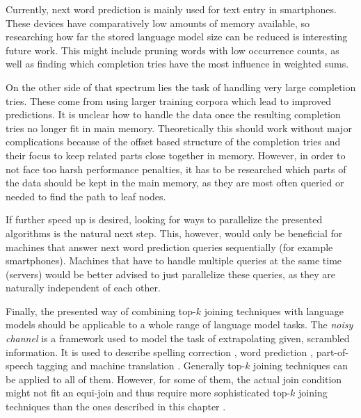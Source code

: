 Currently, next word prediction is mainly used for text entry in smartphones.
These devices have comparatively low amounts of memory available, so researching
how far the stored language model size can be reduced is interesting future
work.
This might include pruning words with low occurrence counts, as well as finding
which completion tries have the most influence in weighted sums.

On the other side of that spectrum lies the task of handling very large
completion tries.
These come from using larger training corpora which lead to improved
predictions.
It is unclear how to handle the data once the resulting completion tries no
longer fit in main memory.
Theoretically this should work without major complications because of the offset
based structure of the completion tries and their focus to keep related parts
close together in memory.
However, in order to not face too harsh performance penalties, it has to
be researched which parts of the data should be kept in the main memory, as they
are most often queried or needed to find the path to leaf nodes.

If further speed up is desired, looking for ways to parallelize the presented
algorithms is the natural next step.
This, however, would only be beneficial for machines that answer next word
prediction queries sequentially (for example smartphones).
Machines that have to handle multiple queries at the same time (servers) would
be better advised to just parallelize these queries, as they are naturally
independent of each other.

Finally, the presented way of combining top-$k$ joining techniques with language
models should be applicable to a whole range of language model tasks.
The \emph{noisy channel} \parencite{Shannon1948} is a framework used to model
the task of extrapolating given, scrambled information.
It is used to describe spelling correction
\parencite{JurafskyMartin2009,Manning2008,Kernighan1990,Mays1991},
word prediction \parencite{Bickel2005}, part-of-speech tagging
\parencite{Church1988} and machine translation \parencite{Brown1990}.
Generally top-$k$ joining techniques can be applied to all of them.
However, for some of them, the actual join condition might not fit an equi-join
and thus require more sophisticated top-$k$ joining techniques than the ones
described in this chapter \parencite{Ilyas2004}.

